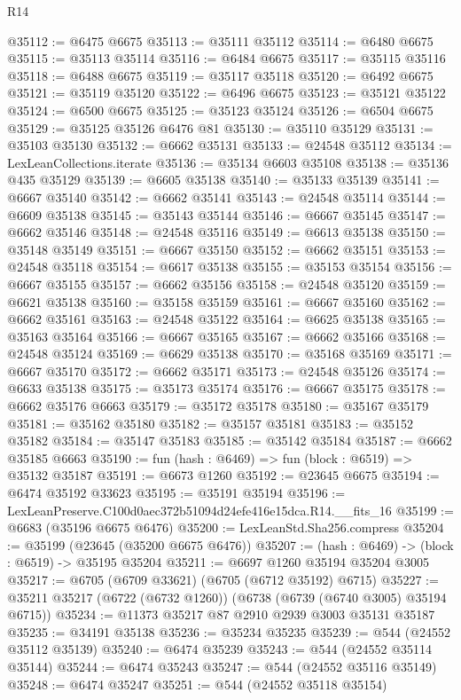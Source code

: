 \begin{lexlean}{R14}
\begin{coremodule}
@35112 := @6475 @6675
@35113 := @35111 @35112
@35114 := @6480 @6675
@35115 := @35113 @35114
@35116 := @6484 @6675
@35117 := @35115 @35116
@35118 := @6488 @6675
@35119 := @35117 @35118
@35120 := @6492 @6675
@35121 := @35119 @35120
@35122 := @6496 @6675
@35123 := @35121 @35122
@35124 := @6500 @6675
@35125 := @35123 @35124
@35126 := @6504 @6675
@35129 := @35125 @35126 @6476 @81
@35130 := @35110 @35129
@35131 := @35103 @35130
@35132 := @6662 @35131
@35133 := @24548 @35112
@35134 := LexLeanCollections.iterate
@35136 := @35134 @6603 @35108
@35138 := @35136 @435 @35129
@35139 := @6605 @35138
@35140 := @35133 @35139
@35141 := @6667 @35140
@35142 := @6662 @35141
@35143 := @24548 @35114
@35144 := @6609 @35138
@35145 := @35143 @35144
@35146 := @6667 @35145
@35147 := @6662 @35146
@35148 := @24548 @35116
@35149 := @6613 @35138
@35150 := @35148 @35149
@35151 := @6667 @35150
@35152 := @6662 @35151
@35153 := @24548 @35118
@35154 := @6617 @35138
@35155 := @35153 @35154
@35156 := @6667 @35155
@35157 := @6662 @35156
@35158 := @24548 @35120
@35159 := @6621 @35138
@35160 := @35158 @35159
@35161 := @6667 @35160
@35162 := @6662 @35161
@35163 := @24548 @35122
@35164 := @6625 @35138
@35165 := @35163 @35164
@35166 := @6667 @35165
@35167 := @6662 @35166
@35168 := @24548 @35124
@35169 := @6629 @35138
@35170 := @35168 @35169
@35171 := @6667 @35170
@35172 := @6662 @35171
@35173 := @24548 @35126
@35174 := @6633 @35138
@35175 := @35173 @35174
@35176 := @6667 @35175
@35178 := @6662 @35176 @6663
@35179 := @35172 @35178
@35180 := @35167 @35179
@35181 := @35162 @35180
@35182 := @35157 @35181
@35183 := @35152 @35182
@35184 := @35147 @35183
@35185 := @35142 @35184
@35187 := @6662 @35185 @6663
@35190 := fun (hash : @6469) => fun (block : @6519) => @35132 @35187
@35191 := @6673 @1260
@35192 := @23645 @6675
@35194 := @6474 @35192 @33623
@35195 := @35191 @35194
@35196 := LexLeanPreserve.C100d0aec372b51094d24efe416e15dca.R14.__fits_16
@35199 := @6683 (@35196 @6675 @6476)
@35200 := LexLeanStd.Sha256.compress
@35204 := @35199 (@23645 (@35200 @6675 @6476))
@35207 := (hash : @6469) -> (block : @6519) -> @35195 @35204
@35211 := @6697 @1260 @35194 @35204 @3005
@35217 := @6705 (@6709 @33621) (@6705 (@6712 @35192) @6715)
@35227 := @35211 @35217 (@6722 (@6732 @1260)) (@6738 (@6739 (@6740 @3005) @35194 @6715))
@35234 := @11373 @35217 @87 @2910 @2939 @3003 @35131 @35187
@35235 := @34191 @35138
@35236 := @35234 @35235
@35239 := @544 (@24552 @35112 @35139)
@35240 := @6474 @35239
@35243 := @544 (@24552 @35114 @35144)
@35244 := @6474 @35243
@35247 := @544 (@24552 @35116 @35149)
@35248 := @6474 @35247
@35251 := @544 (@24552 @35118 @35154)

\end{coremodule}
\end{lexlean}
